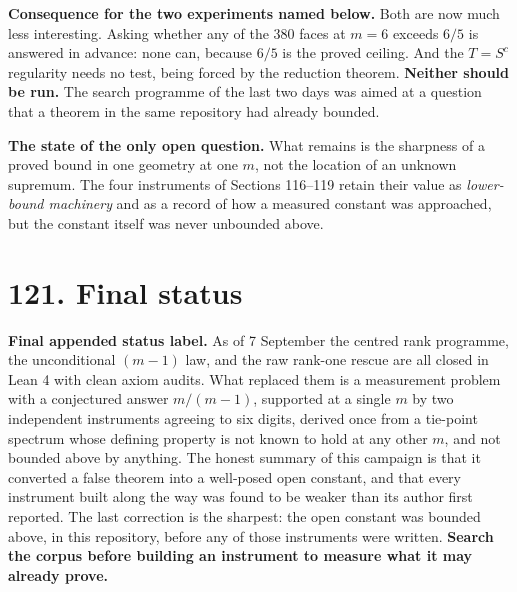 \documentclass[9pt,twocolumn]{article}
\renewcommand{\_}{\CIGunderscore\allowbreak}
\begin{document}
\textbf{Consequence for the two experiments named below.} Both are now much less interesting. Asking whether any of the $380$ faces at $m=6$ exceeds $6/5$ is answered in advance: none can, because $6/5$ is the proved ceiling. And the $T=S^{c}$ regularity needs no test, being forced by the reduction theorem. \textbf{Neither should be run.} The search programme of the last two days was aimed at a question that a theorem in the same repository had already bounded.

\textbf{The state of the only open question.} What remains is the sharpness of a proved bound in one geometry at one $m$, not the location of an unknown supremum. The four instruments of Sections 116--119 retain their value as \emph{lower-bound machinery} and as a record of how a measured constant was approached, but the constant itself was never unbounded above.

\section*{121. Final status}
\textbf{Final appended status label.} As of 7 September the centred rank programme, the unconditional $(m-1)$ law, and the raw rank-one rescue are all closed in Lean 4 with clean axiom audits. What replaced them is a measurement problem with a conjectured answer $m/(m-1)$, supported at a single $m$ by two independent instruments agreeing to six digits, derived once from a tie-point spectrum whose defining property is not known to hold at any other $m$, and not bounded above by anything. The honest summary of this campaign is that it converted a false theorem into a well-posed open constant, and that every instrument built along the way was found to be weaker than its author first reported. The last correction is the sharpest: the open constant was bounded above, in this repository, before any of those instruments were written. \textbf{Search the corpus before building an instrument to measure what it may already prove.}
\end{document}
